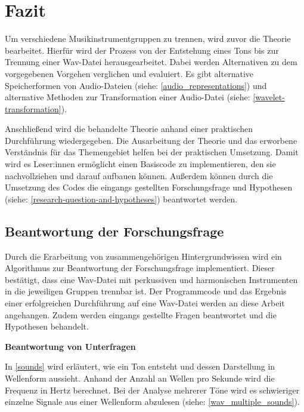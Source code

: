 \chapter{Fazit}
%

Um verschiedene Musikinstrumentgruppen zu trennen, wird zuvor die Theorie bearbeitet.
Hierfür wird der Prozess von der Entstehung eines Tons bis zur Trennung einer Wav-Datei herausgearbeitet.
Dabei werden Alternativen zu dem vorgegebenen Vorgehen verglichen und evaluiert.
Es gibt alternative Speicherformen von Audio-Dateien (siehe: \cref{audio_representations}) und alternative Methoden zur Transformation einer Audio-Datei (siehe: \cref{wavelet-transformation}).

\par

Anschließend wird die behandelte Theorie anhand einer praktischen Durchführung wiedergegeben.
Die Ausarbeitung der Theorie und das erworbene Verständnis für das Themengebiet helfen bei der praktischen Umsetzung.
Damit wird es Leser:innen ermöglicht einen Basiscode zu implementieren, den sie nachvollziehen und darauf aufbauen können.
Außerdem können durch die Umsetzung des Codes die eingangs gestellten Forschungsfrage und Hypothesen (siehe: \cref{research-question-and-hypotheses}) beantwortet werden.

%
\section{Beantwortung der Forschungsfrage}
%

Durch die Erarbeitung von zusammengehörigen Hintergrundwissen wird ein Algorithmus zur Beantwortung der Forschungsfrage implementiert.
Dieser bestätigt, dass eine Wav-Datei mit perkussiven und harmonischen Instrumenten in die jeweiligen Gruppen trennbar ist.
Der Programmcode und das Ergebnis einer erfolgreichen Durchführung auf eine Wav-Datei werden an diese Arbeit angehangen.
Zudem werden eingangs gestellte Fragen beantwortet und die Hypothesen behandelt.

%
\textbf{Beantwortung von Unterfragen}
%

In \cref{sounds} wird erläutert, wie ein Ton entsteht und dessen Darstellung in Wellenform aussieht.
Anhand der Anzahl an Wellen pro Sekunde wird die Frequenz in Hertz berechnet.
Bei der Analyse mehrerer Töne wird es schwieriger einzelne Signale aus einer Wellenform abzulesen (siehe: \cref{wav_multiple_sounds}).

\par

